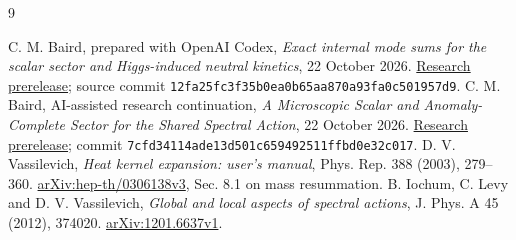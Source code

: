 \documentclass[11pt,letterpaper]{article}
\begin{document}
\begin{thebibliography}{9}\small\raggedright
{} C. M. Baird, prepared with OpenAI Codex, \emph{Exact internal mode sums for the scalar sector and Higgs-induced neutral kinetics}, 22 October 2026. \href{https://github.com/Cbaird26/mqgt-scf-continued/releases/tag/v2026.10.22-exact-scalar-mode-sums}{Research prerelease}; source commit \texttt{12fa25fc3f35b0ea0b65aa870a93fa0c501957d9}.
 C. M. Baird, AI-assisted research continuation, \emph{A Microscopic Scalar and Anomaly-Complete Sector for the Shared Spectral Action}, 22 October 2026. \href{https://github.com/Cbaird26/mqgt-scf-continued/releases/tag/v2026.10.22-scalar-anomaly-sector}{Research prerelease}; commit \texttt{7cfd34114ade13d501c659492511ffbd0e32c017}.
 D. V. Vassilevich, \emph{Heat kernel expansion: user's manual}, Phys. Rep. 388 (2003), 279--360. \href{https://arxiv.org/abs/hep-th/0306138v3}{arXiv:hep-th/0306138v3}, Sec. 8.1 on mass resummation.
 B. Iochum, C. Levy and D. V. Vassilevich, \emph{Global and local aspects of spectral actions}, J. Phys. A 45 (2012), 374020. \href{https://arxiv.org/abs/1201.6637v1}{arXiv:1201.6637v1}.
\end{thebibliography}
\end{document}

